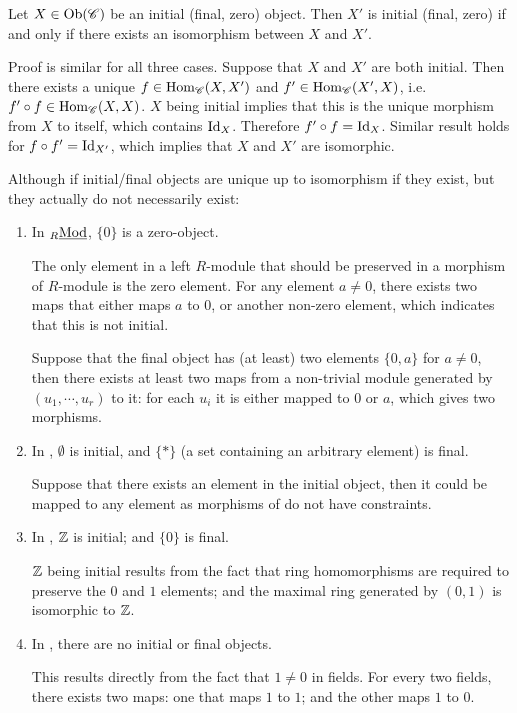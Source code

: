 \begin{remark}
    Let $X \in \mathrm{Ob}(\mathscr{C})$ be an initial (final, zero) object. Then $X'$ is initial (final, zero) if and only if there exists an isomorphism between $X$ and $X'$.

    Proof is similar for all three cases. Suppose that $X$ and $X'$ are both initial. Then there exists a unique $f \in \mathrm{Hom}_{\mathscr{C}}(X, X')$ and $f'\in \mathrm{Hom}_{\mathscr{C}}(X', X)$, i.e. $f' \circ f \in \mathrm{Hom}_{\mathscr{C}}(X, X)$. $X$ being initial implies that this is the unique morphism from $X$ to itself, which contains $\mathrm{Id}_{X}$. Therefore $f' \circ f = \mathrm{Id}_{X}$. Similar result holds for $f \circ f' = \mathrm{Id}_{X'}$, which implies that $X$ and $X'$ are isomorphic.
\end{remark}

\begin{example}
    Although if initial/final objects are unique up to isomorphism if they exist, but they actually do not necessarily exist:
    \begin{enumerate}
        \item In ${}_{R}\underline{\textup{Mod}}$, $\{0\}$ is a zero-object. 
        
        The only element in a left $R$-module that should be preserved in a morphism of $R$-module is the zero element. For any element $a \neq 0$, there exists two maps that either maps $a$ to 0, or another non-zero element, which indicates that this is not initial. 

        Suppose that the final object has (at least) two elements $\{0, a\}$ for $a \neq 0$, then there exists at least two maps from a non-trivial module generated by $(u_1, \cdots, u_r)$ to it: for each $u_i$ it is either mapped to $0$ or $a$, which gives two morphisms. 
        \item In \catsets, $\emptyset$ is initial, and $\{\ast\}$ (a set containing an arbitrary element) is final.
        
        Suppose that there exists an element in the initial object, then it could be mapped to any element as morphisms of \catsets do not have constraints. 
        \item In \catrings, $\mathbb{Z}$ is initial; and $\{0\}$ is final. 
        
        $\mathbb{Z}$ being initial results from the fact that ring homomorphisms are required to preserve the $0$ and $1$ elements; and the maximal ring generated by $(0, 1)$ is isomorphic to $\mathbb{Z}$.
        \item In \catfields, there are no initial or final objects.
        
        This results directly from the fact that $1 \neq 0$ in fields. For every two fields, there exists two maps: one that maps $1$ to $1$; and the other maps $1$ to $0$.
    \end{enumerate}
\end{example}

